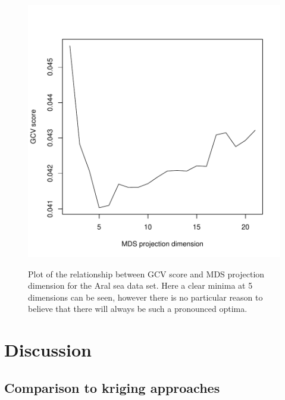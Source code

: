 \documentclass[useAMS,referee]{biom}
\begin{document}
\begin{figure}
\centering
\includegraphics[width=\textwidth]{examples/aral/aral-gcvplot.pdf} \\
\caption{Plot of the relationship between GCV score and MDS projection dimension for the Aral sea data set. Here a clear minima at 5 dimensions can be seen, however there is no particular reason to believe that there will always be such a pronounced optima.}
\label{aral-gcvplot}
\end{figure}



\section{Discussion}
\label{conclusion}





\subsection{Comparison to kriging approaches}
\end{document}

